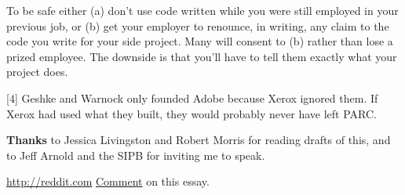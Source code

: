 To be
                  safe either (a) don't use code written while you were still
                  employed in your previous job, or (b) get your employer to
                  renounce, in writing, any claim to the code you write for your
                  side project. Many will consent to (b) rather than lose a
                  prized employee. The downside is that you'll have to tell them
                  exactly what your project does.

[4] Geshke and Warnock only founded Adobe because Xerox ignored
                  them. If Xerox had used what they built, they would probably
                  never have left PARC.

\textbf{Thanks} to Jessica
                  Livingston and Robert Morris for reading drafts of this, and
                  to Jeff Arnold and the SIPB for inviting me to speak.

\href{http://reddit.com}{http://reddit.com}
                  \href{http://reddit.com/info/l1xb/comments}{ Comment} on
                  this essay.


              
            
          

